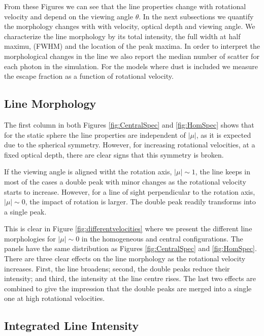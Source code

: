 \documentclass{emulateapj}
\newcommand{\ly}{{\ifmmode{{\rm Ly}\alpha~}\else{Ly$\alpha$~}\fi}}
\begin{document}
From these Figures we can see that the line properties change with
rotational velocity and depend on the viewing angle $\theta$.  
In the next subsections we quantify the morphology changes with with
velocity, optical depth and viewing angle.  
We characterize the line morphology by its total intensity, the full
width at half maximu, (FWHM) and the location of the peak maxima. 
In order to interpret the
morphological changes in the line we also report the median number of
scatter for each \ly photon in the simulation. 
For the models where dust is included we measure the escape fraction
as a function of rotational velocity.   

\subsection{Line Morphology}
\label{sec:angles}

The first column in both Figures \ref{fig:CentralSpec} and
\ref{fig:HomSpec} shows that for the static sphere the line properties
are independent of $|\mu|$, as it is expected due
to the spherical symmetry. 
However, for increasing rotational velocities, at a fixed optical
depth, there are clear signs that this symmetry is broken. 

If the viewing angle is aligned witht the rotation axis, $|\mu|\sim
1$, the \ly line keeps in most of the cases a double peak with minor
changes as the rotational velocity starts to increase. 
However, for a line of sight perpendicular to the rotation axis,
$|\mu|\sim 0$, the impact of  rotation is larger.  
The double peak readily transforms into a single peak.

This is clear in  Figure \ref{fig:differentvelocities} where we
present the different line morphologies for $|\mu|\sim 0$ in the
homogeneous and central configurations.  
The panels have the same distribution as Figures \ref{fig:CentralSpec}
and \ref{fig:HomSpec}.    
There are three clear effects on the line morphology as the rotational
velocity increases.  
First, the line broadens; second, the double peaks reduce their intensity; and
third, the intensity at the line centre rises. 
The last two effects are combined to give the impression that the double
peaks are merged into a single one at high rotational velocities. 



\subsection{Integrated Line Intensity}
\end{document}
